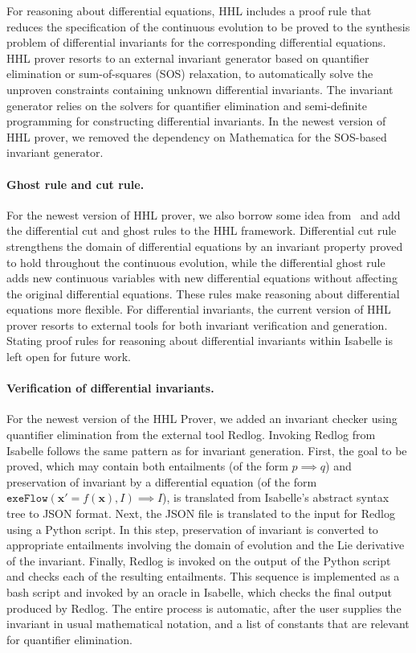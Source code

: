 \documentclass[runningheads,a4paper]{llncs}
\begin{document}
For reasoning about differential equations, HHL includes a proof rule
that reduces the specification of the continuous evolution to be
proved to the synthesis problem of differential invariants for the
corresponding differential equations. HHL prover resorts to an
external invariant generator based on quantifier elimination or
sum-of-squares (SOS) relaxation, to automatically solve the unproven
constraints containing unknown differential invariants. The invariant
generator relies on the solvers for quantifier elimination and
semi-definite programming for constructing differential invariants. In
the newest version of HHL prover, we removed the dependency on
Mathematica for the SOS-based invariant generator.

\paragraph{Ghost rule and cut rule.}

For the newest version of HHL prover, we also borrow some idea
from~\cite{Platzer18} and add the differential cut and ghost rules to
the HHL framework. Differential cut rule strengthens the domain of
differential equations by an invariant property proved to hold
throughout the continuous evolution, while the differential ghost rule
adds new continuous variables with new differential equations without
affecting the original differential equations. These rules make
reasoning about differential equations more flexible. For differential
invariants, the current version of HHL prover resorts to external
tools for both invariant verification and generation. Stating proof
rules for reasoning about differential invariants within Isabelle is
left open for future work.

\paragraph{Verification of differential invariants.}

For the newest version of the HHL Prover, we added an invariant
checker using quantifier elimination from the external tool
Redlog. Invoking Redlog from Isabelle follows the same pattern as for
invariant generation. First, the goal to be proved, which may contain
both entailments (of the form $p\implies q$) and preservation of
invariant by a differential equation (of the form
$\mathtt{exeFlow}(\mathbf{x'}=f(\mathbf{x}),I)\implies I$), is
translated from Isabelle's abstract syntax tree to JSON format. Next,
the JSON file is translated to the input for Redlog using a Python
script. In this step, preservation of invariant is converted to
appropriate entailments involving the domain of evolution and the Lie
derivative of the invariant. Finally, Redlog is invoked on the output
of the Python script and checks each of the resulting
entailments. This sequence is implemented as a bash script and invoked
by an oracle in Isabelle, which checks the final output produced by
Redlog. The entire process is automatic, after the user supplies the
invariant in usual mathematical notation, and a list of constants that
are relevant for quantifier elimination.
\end{document}
